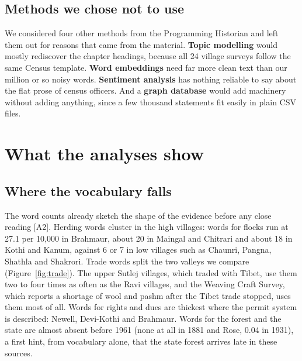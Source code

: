 \documentclass[10pt,a4paper,twocolumn]{article}
\newcommand{\entry}[1]{{\small\sffamily\color{muted}[#1]}}
\begin{document}
\subsection{Methods we chose not to use}

We considered four other methods from the Programming Historian and left them out for reasons that came from the material. \textbf{Topic modelling} would mostly rediscover the chapter headings, because all 24 village surveys follow the same Census template. \textbf{Word embeddings} need far more clean text than our million or so noisy words. \textbf{Sentiment analysis} has nothing reliable to say about the flat prose of census officers. And a \textbf{graph database} would add machinery without adding anything, since a few thousand statements fit easily in plain CSV files.

\section{What the analyses show}\label{sec:findings}

\subsection{Where the vocabulary falls}

The word counts already sketch the shape of the evidence before any close reading \entry{A2}. Herding words cluster in the high villages: words for flocks run at 27.1 per 10,000 in Brahmaur, about 20 in Maingal and Chitrari and about 18 in Kothi and Kanum, against 6 or 7 in low villages such as Chaunri, Pangna, Shathla and Shakrori. Trade words split the two valleys we compare (Figure~\ref{fig:trade}). The upper Sutlej villages, which traded with Tibet, use them two to four times as often as the Ravi villages, and the Weaving Craft Survey, which reports a shortage of wool and pashm after the Tibet trade stopped, uses them most of all. Words for rights and dues are thickest where the permit system is described: Newell, Devi-Kothi and Brahmaur. Words for the forest and the state are almost absent before 1961 (none at all in 1881 and Rose, 0.04 in 1931), a first hint, from vocabulary alone, that the state forest arrives late in these sources.
\end{document}
